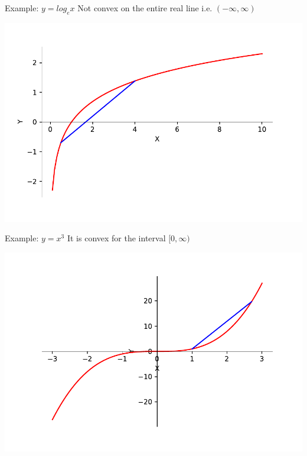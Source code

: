 \documentclass{beamer}
\begin{document}
	\begin{frame}{Example: $y = log_ex$}
	Not convex on the entire real line i.e. $(-\infty, \infty)$
	\begin{center}
	\includegraphics[scale=0.5]{y-logx}
	\end{center}
	\end{frame}

	\begin{frame}{Example: $y = x^3$}
	It is convex for the interval $[0,\infty)$
	\begin{center}
	\includegraphics[scale=0.5]{y-x3_pos}
	\end{center}
	\end{frame}
\end{document}
